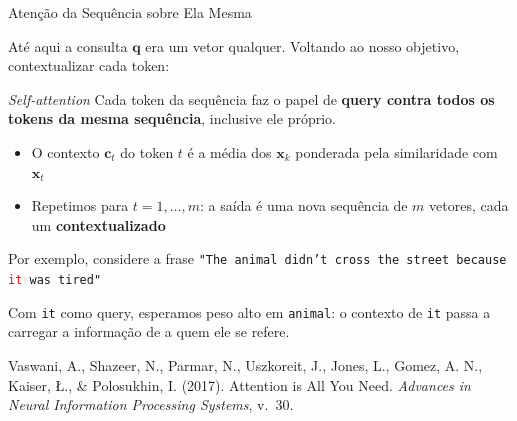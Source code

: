 \documentclass[aspectratio=169,xcolor=dvipsnames]{beamer}
\begin{document}
\begin{frame}[shrink=5]{Atenção da Sequência sobre Ela Mesma}

Até aqui a consulta $\mathbf{q}$ era um vetor qualquer. Voltando ao nosso objetivo, contextualizar cada token:

\vspace{4pt}

\begin{block}{\textit{Self-attention}}
Cada token da sequência faz o papel de \textbf{query contra todos os tokens da mesma sequência}, inclusive ele próprio.
\begin{itemize}
    \item O contexto $\mathbf{c}_t$ do token $t$ é a média dos $\mathbf{x}_k$ ponderada pela similaridade com $\mathbf{x}_t$
    \item Repetimos para $t = 1, \dots, m$: a saída é uma nova sequência de $m$ vetores, cada um \textbf{contextualizado}
\end{itemize}
\end{block}

\begin{exampleblock}{Por exemplo, considere a frase}
\centering
\texttt{"The animal didn't cross the street because \textcolor{red}{it} was tired"}
\end{exampleblock}

Com \texttt{it} como query, esperamos peso alto em \texttt{animal}: o contexto de \texttt{it} passa a carregar a informação de a quem ele se refere.

\vspace{2pt}
\centering
\footnotesize Vaswani, A., Shazeer, N., Parmar, N., Uszkoreit, J., Jones, L., Gomez, A. N., Kaiser, {\L}., \& Polosukhin, I. (2017). Attention is All You Need. \textit{Advances in Neural Information Processing Systems}, v.\ 30.

\end{frame}

\end{document}
